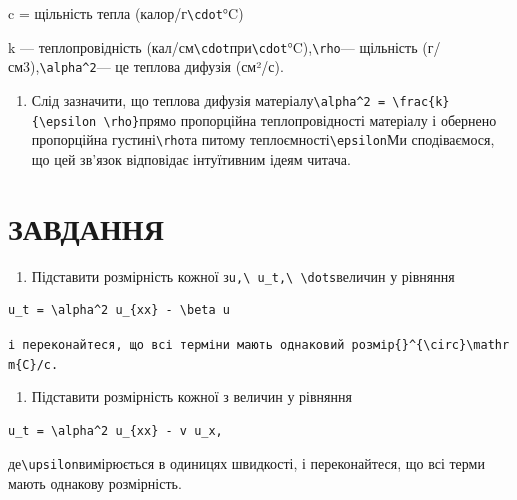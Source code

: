 \documentclass[
  ukrainian,
]{article}
\providecommand{\tightlist}{%
  \setlength{\itemsep}{0pt}\setlength{\parskip}{0pt}}
\begin{document}
c = щільність тепла (калор/г\texttt{\textbackslash{}cdot}°C)

k --- теплопровідність
(кал/см\texttt{\textbackslash{}cdot}при\texttt{\textbackslash{}cdot}°C),\texttt{\textbackslash{}rho}---
щільність (г/см3),\texttt{\textbackslash{}alpha\^{}2}--- це теплова
дифузія (см²/с).

\begin{enumerate}
\def\labelenumi{\arabic{enumi}.}
\setcounter{enumi}{3}
\tightlist
\item
  Слід зазначити, що теплова дифузія
  матеріалу\texttt{\textbackslash{}alpha\^{}2\ =\ \textbackslash{}frac\{k\}\{\textbackslash{}epsilon\ \textbackslash{}rho\}}прямо
  пропорційна теплопровідності матеріалу і обернено пропорційна
  густині\texttt{\textbackslash{}rho}та питому
  теплоємності\texttt{\textbackslash{}epsilon}Ми сподіваємося, що цей
  зв'язок відповідає інтуїтивним ідеям читача.
\end{enumerate}

\section{ЗАВДАННЯ}\label{ux437ux430ux432ux434ux430ux43dux43dux44f-1}

\begin{enumerate}
\def\labelenumi{\arabic{enumi}.}
\tightlist
\item
  Підставити розмірність кожної
  з\texttt{u,\textbackslash{}\ u\_t,\textbackslash{}\ \textbackslash{}dots}величин
  у рівняння
\end{enumerate}

\begin{verbatim}
u_t = \alpha^2 u_{xx} - \beta u
\end{verbatim}

\texttt{і\ переконайтеся,\ що\ всі\ терміни\ мають\ однаковий\ розмір\textquotesingle{}\{\}\^{}\{\textbackslash{}circ\}\textbackslash{}mathrm\{C\}/c\textquotesingle{}.}

\begin{enumerate}
\def\labelenumi{\arabic{enumi}.}
\setcounter{enumi}{1}
\tightlist
\item
  Підставити розмірність кожної з величин у рівняння
\end{enumerate}

\begin{verbatim}
u_t = \alpha^2 u_{xx} - v u_x,
\end{verbatim}

де\texttt{\textbackslash{}upsilon}вимірюється в одиницях швидкості, і
переконайтеся, що всі терми мають однакову розмірність.
\end{document}
